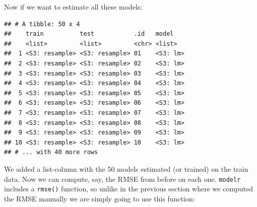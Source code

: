 \documentclass[]{gitbook}
\newenvironment{Shaded}{\begin{snugshade}}{\end{snugshade}}
\newcommand{\DataTypeTok}[1]{\textcolor[rgb]{0.13,0.29,0.53}{#1}}
\newcommand{\KeywordTok}[1]{\textcolor[rgb]{0.13,0.29,0.53}{\textbf{#1}}}
\newcommand{\NormalTok}[1]{#1}
\newcommand{\OperatorTok}[1]{\textcolor[rgb]{0.81,0.36,0.00}{\textbf{#1}}}
\newcommand{\StringTok}[1]{\textcolor[rgb]{0.31,0.60,0.02}{#1}}
\theoremstyle{definition}
\theoremstyle{definition}
\theoremstyle{definition}
\theoremstyle{remark}
\begin{document}
Now if we want to estimate all these models:

\begin{Shaded}
\end{Shaded}

\begin{verbatim}
## # A tibble: 50 x 4
##    train          test           .id   model   
##    <list>         <list>         <chr> <list>  
##  1 <S3: resample> <S3: resample> 01    <S3: lm>
##  2 <S3: resample> <S3: resample> 02    <S3: lm>
##  3 <S3: resample> <S3: resample> 03    <S3: lm>
##  4 <S3: resample> <S3: resample> 04    <S3: lm>
##  5 <S3: resample> <S3: resample> 05    <S3: lm>
##  6 <S3: resample> <S3: resample> 06    <S3: lm>
##  7 <S3: resample> <S3: resample> 07    <S3: lm>
##  8 <S3: resample> <S3: resample> 08    <S3: lm>
##  9 <S3: resample> <S3: resample> 09    <S3: lm>
## 10 <S3: resample> <S3: resample> 10    <S3: lm>
## # ... with 40 more rows
\end{verbatim}

We added a list-column with the 50 models estimated (or trained) on the
train data. Now we can compute, say, the RMSE from before on each one.
\texttt{modelr} includes a \texttt{rmse()} function, so unlike in the
previous section where we computed the RMSE manually we are simply going
to use this function:

\begin{Shaded}
\end{Shaded}
\end{document}
